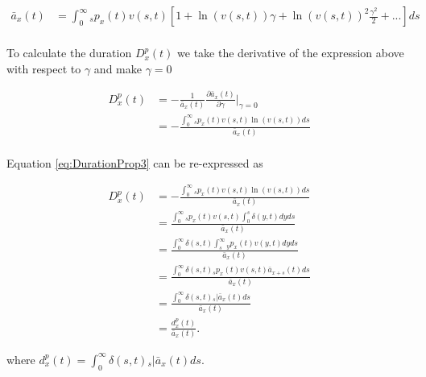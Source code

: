 \documentclass[12pt]{article}
\begin{document}
\begin{equation}\label{eq:DurationProp2}
\begin{split}
\bar{a}_x(t) &= \int_0^\infty {}_sp_x(t) v(s,t)[1+\ln(v(s,t)) \gamma+{\ln(v(s,t))}^2 \frac{\gamma^2}{2}+...]ds\\
\end{split}
\end{equation}


To calculate the duration ${D}^{p}_{x}(t)$ we take the derivative of the expression above with respect to $\gamma$ and make $\gamma=0$

\begin{equation}\label{eq:DurationProp3}
\begin{split}
{D}^{p}_{x}(t)&=-\frac{1}{\bar{a}_x(t)}\frac{\partial \bar{a}_x(t)}{\partial \gamma} \bigg\rvert_{\gamma=0} \\
&= -\frac{\int_0^\infty {}_sp_x(t) v(s,t) \ln(v(s,t))ds}{\bar{a}_x(t)} \\
\end{split}
\end{equation}


Equation \ref{eq:DurationProp3} can be re-expressed as 


\begin{equation}\label{eq:DurationProp4}
\begin{split}
{D}^{p}_{x}(t) &= -\frac{\int_0^\infty {}_sp_x(t) v(s,t) \ln(v(s,t))ds}{\bar{a}_x(t)}\\
&= \frac{\int_0^\infty {}_sp_x(t) v(s,t) \int_0^{s} \delta(y,t)dy ds }{\bar{a}_x(t)}\\
&= \frac{\int_0^\infty \delta(s,t)  \int_{s}^{\infty} {}_{y}p_x(t) v(y,t)dy ds }{\bar{a}_x(t)}\\
&= \frac{\int_0^\infty \delta(s,t) {}_sp_x(t) v(s,t) \bar{a}_{x+s}(t)  ds }{\bar{a}_x(t)}\\
&= \frac{\int_0^\infty \delta(s,t) {}_s|\bar{a}_x(t) ds}{\bar{a}_x(t)} \\
&= \frac{{d}^{p}_{x}(t)}{\bar{a}_x(t)}.
\end{split}
\end{equation}



where ${d}^{p}_{x}(t)=\int_0^\infty \delta(s,t) {}_s|\bar{a}_x(t) ds$.

\setcounter{figure}{0}
\end{document}

